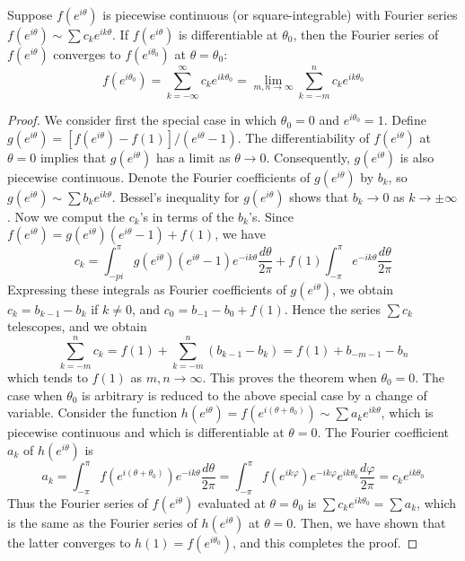 \begin{theorem}
    Suppose $f(e^{i\theta})$ is piecewise continuous (or square-integrable) with Fourier series $f(e^{i\theta}) \sim \sum c_ke^{ik\theta}$. If $f(e^{i\theta})$ is differentiable at $\theta_0$, then the Fourier series of $f(e^{i\theta})$ converges to $f(e^{i\theta_0})$ at $\theta = \theta_0$: \begin{equation*}
        f(e^{i\theta_0}) = \sum_{k=-\infty}^{\infty}c_ke^{ik\theta_0} = \lim\limits_{m,n\rightarrow \infty}\sum_{k=-m}^nc_ke^{ik\theta_0}
    \end{equation*}
\end{theorem}
\begin{proof}
    We consider first the special case in which $\theta_0 = 0$ and $e^{i\theta_0} = 1$. Define $g(e^{i\theta}) = [f(e^{i\theta}) - f(1)]/(e^{i\theta}-1)$. The differentiability of $f(e^{i\theta})$ at $\theta = 0$ implies that $g(e^{i\theta})$ has a limit as $\theta\rightarrow 0$. Consequently, $g(e^{i\theta})$ is also piecewise continuous. Denote the Fourier coefficients of $g(e^{i\theta})$ by $b_k$, so $g(e^{i\theta}) \sim \sum b_ke^{ik\theta}$. Bessel's inequality for $g(e^{i\theta})$ shows that $b_k\rightarrow 0$ as $k\rightarrow \pm \infty$. Now we comput the $c_k$'s in terms of the $b_k$'s. Since $f(e^{i\theta}) = g(e^{i\theta})(e^{i\theta}-1)+f(1)$, we have \begin{equation*}
        c_k = \int_{-pi}^{\pi}g(e^{i\theta})(e^{i\theta}-1)e^{-ik\theta}\frac{d\theta}{2\pi}+f(1)\int_{-\pi}^{\pi}e^{-ik\theta}\frac{d\theta}{2\pi}
    \end{equation*}
    Expressing these integrals as Fourier coefficients of $g(e^{i\theta})$, we obtain $c_k = b_{k-1}-b_k$ if $k \neq 0$, and $c_0 = b_{-1}-b_0+f(1)$. Hence the series $\sum c_k$ telescopes, and we obtain \begin{equation*}
        \sum_{k=-m}^nc_k = f(1) + \sum_{k=-m}^n(b_{k-1}-b_k) = f(1) + b_{-m-1}-b_n
    \end{equation*}
    which tends to $f(1)$ as $m,n\rightarrow \infty$. This proves the theorem when $\theta_0 = 0$. The case when $\theta_0$ is arbitrary is reduced to the above special case by a change of variable. Consider the function $h(e^{i\theta}) = f(e^{i(\theta+\theta_0)}) \sim \sum a_ke^{ik\theta}$, which is piecewise continuous and which is differentiable at $\theta = 0$. The Fourier coefficient $a_k$ of $h(e^{i\theta})$ is \begin{equation*}
        a_k = \int_{-\pi}^{\pi}f(e^{i(\theta+\theta_0)})e^{-ik\theta}\frac{d\theta}{2\pi} = \int_{-\pi}^{\pi}f(e^{ik\varphi})e^{-ik\varphi}e^{ik\theta_0}\frac{d\varphi}{2\pi} = c_ke^{ik\theta_0}
    \end{equation*}
    Thus the Fourier series of $f(e^{i\theta})$ evaluated at $\theta = \theta_0$ is $\sum c_ke^{ik\theta_0} = \sum a_k$, which is the same as the Fourier series of $h(e^{i\theta})$ at $\theta = 0$. Then, we have shown that the latter converges to $h(1) = f(e^{i\theta_0})$, and this completes the proof.
\end{proof}

